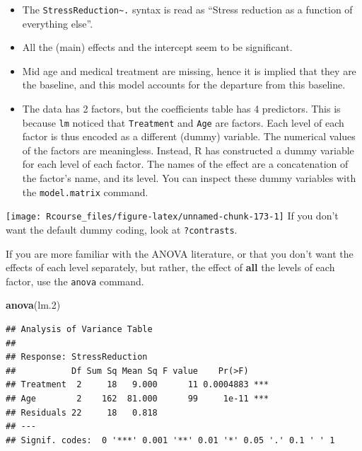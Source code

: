 \documentclass[]{book}
\newenvironment{Shaded}{\begin{snugshade}}{\end{snugshade}}
\newcommand{\FloatTok}[1]{\textcolor[rgb]{0.00,0.00,0.81}{#1}}
\newcommand{\KeywordTok}[1]{\textcolor[rgb]{0.13,0.29,0.53}{\textbf{#1}}}
\newcommand{\NormalTok}[1]{#1}
\newcommand{\OperatorTok}[1]{\textcolor[rgb]{0.81,0.36,0.00}{\textbf{#1}}}
\newcommand{\StringTok}[1]{\textcolor[rgb]{0.31,0.60,0.02}{#1}}
\theoremstyle{definition}
\theoremstyle{definition}
\theoremstyle{definition}
\theoremstyle{remark}
\begin{document}
\begin{itemize}
\item
  The \texttt{StressReduction\textasciitilde{}.} syntax is read as ``Stress reduction as a function of everything else''.
\item
  All the (main) effects and the intercept seem to be significant.
\item
  Mid age and medical treatment are missing, hence it is implied that they are the baseline, and this model accounts for the departure from this baseline.
\item
  The data has 2 factors, but the coefficients table has 4 predictors. This is because \texttt{lm} noticed that \texttt{Treatment} and \texttt{Age} are factors. Each level of each factor is thus encoded as a different (dummy) variable.
  The numerical values of the factors are meaningless.
  Instead, R has constructed a dummy variable for each level of each factor.
  The names of the effect are a concatenation of the factor's name, and its level.
  You can inspect these dummy variables with the \texttt{model.matrix} command.
\end{itemize}

\begin{Shaded}
\end{Shaded}

\texttt{[image: Rcourse\_files/figure-latex/unnamed-chunk-173-1]}
If you don't want the default dummy coding, look at \texttt{?contrasts}.

If you are more familiar with the ANOVA literature, or that you don't want the effects of each level separately, but rather, the effect of \textbf{all} the levels of each factor, use the \texttt{anova} command.

\begin{Shaded}
\begin{Highlighting}[]
\KeywordTok{anova}\NormalTok{(lm}\FloatTok{.2}\NormalTok{)}
\end{Highlighting}
\end{Shaded}

\begin{verbatim}
## Analysis of Variance Table
## 
## Response: StressReduction
##           Df Sum Sq Mean Sq F value    Pr(>F)    
## Treatment  2     18   9.000      11 0.0004883 ***
## Age        2    162  81.000      99     1e-11 ***
## Residuals 22     18   0.818                      
## ---
## Signif. codes:  0 '***' 0.001 '**' 0.01 '*' 0.05 '.' 0.1 ' ' 1
\end{verbatim}
\end{document}
